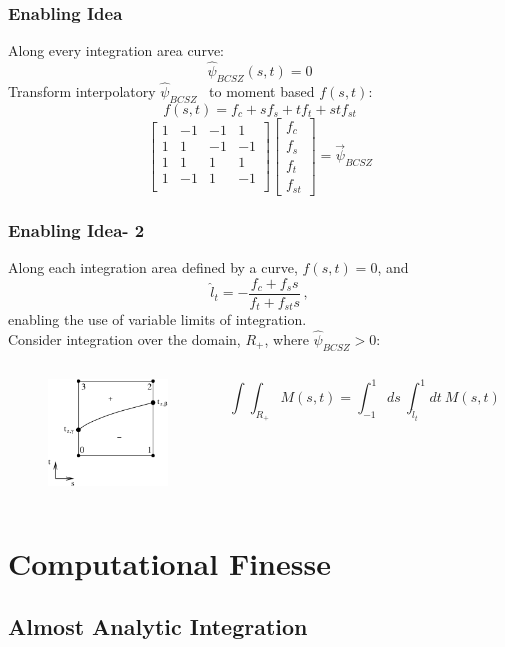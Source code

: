 \documentclass{beamer}
\newcommand{\be}{\begin{equation*}}   %
\newcommand{\ee}{\end{equation*}}
\newcommand{\benum}{\begin{equation}}   %
\newcommand{\eenum}{\end{equation}}
\newcommand{\BCSZH}{\ensuremath{\widehat{\psi}_{BCSZ}}}
\newcommand{\pec}{\, ,}
\begin{document}
\begin{frame}
\frametitle{Enabling Idea}
Along every integration area curve:
\be
\BCSZH(s,t) = 0
\ee
Transform interpolatory \BCSZH~ to moment based $f(s,t)$:
\benum
f(s,t) = f_c + s f_s + t f_t + st f_{st} 
\label{eq:f_def}
\eenum
\benum
\left[ 
\begin{array}{cccc}
1 &	 -1	& -1 &  1    \\
1 &		1	& -1	&  -1		\\	
1 &	  1	&  1		&  1		\\
1 &		-1	& 1		&  -1		\\
\end{array}
\right]
\left[
\begin{array}{c}
f_c \\
f_s \\
f_t \\
f_{st} 
\end{array}
\right]
=\vec{\psi}_{BCSZ}
\eenum

\end{frame}
\begin{frame}
\frametitle{Enabling Idea- 2}

Along each integration area defined by a curve, $f(s,t) = 0$, and 
\benum
\hat{l}_t  = -\frac{f_c + f_s s}{f_t + f_{st} s} \pec
\eenum
enabling the use of variable limits of integration. 
\\
\vspace{0.1in}
Consider integration over the domain, $R_+$, where $\BCSZH>0$:
\begin{columns}[c]
\begin{figure}
\centering
\includegraphics[width=1.25in]{neg_same_side_pdt_int} 
\end{figure}
\be
\int{\int_{R_+}{ M(s,t) } } = 
\int_{-1}^{1}{ds~\int_{\hat{l}_t}^1{dt~M(s,t)} } 
\ee
\end{columns}
\end{frame}


\section{Computational Finesse}
\subsection{Almost Analytic Integration}
\end{document}
